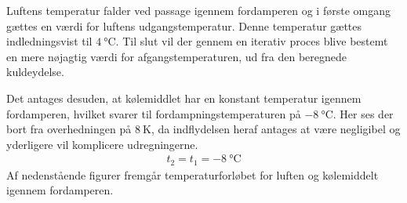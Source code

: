 \documentclass[../Hovedrapport.tex]{subfiles}
\begin{document}
Luftens temperatur falder ved passage igennem fordamperen og i første omgang gættes en værdi for luftens udgangstemperatur. Denne temperatur gættes indledningsvist til $\SI{4}{\celsius}$. Til slut vil der gennem en iterativ proces blive bestemt en mere nøjagtig værdi for afgangstemperaturen, ud fra den beregnede kuldeydelse.

Det antages desuden, at kølemiddlet har en konstant temperatur igennem fordamperen, hvilket svarer til fordampningstemperaturen på $\SI{-8}{\celsius}$. Her ses der bort fra overhedningen på $\SI{8}{\kelvin}$, da indflydelsen heraf antages at være negligibel og yderligere vil komplicere udregningerne.
\begin{align}
    t_{2}= t_{1} = \SI{-8}{\celsius}   
\end{align}
Af nedenstående figurer fremgår temperaturforløbet for luften og kølemiddelt igennem fordamperen. 
\end{document}

